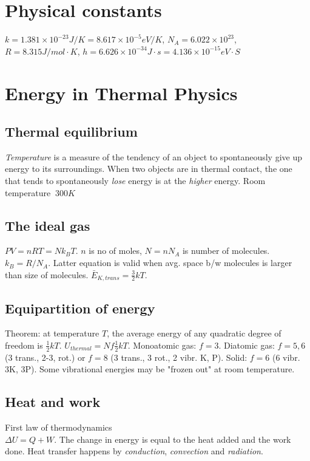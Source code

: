 \documentclass[11pt,twocolumn]{amsart}
\begin{document}
\section{Physical constants}
$k=1.381\times10^{-23}J/K = 8.617\times10^{-5}eV/K$, $N_A = 6.022\times10^{23}$, $R=8.315 J/mol\cdot K$, $h=6.626\times10^{-34}J\cdot s = 4.136\times10^{-15}eV\cdot S$

\section{Energy in Thermal Physics}

\subsection{Thermal equilibrium}
\emph{Temperature} is a measure of the tendency of an object to spontaneously give up energy to its surroundings. When two objects are in thermal contact, the one that tends to spontaneously \emph{lose} energy is at the \emph{higher} energy. Room temperature $~300K$

\subsection{The ideal gas} $PV = nRT = Nk_BT$. $n$ is no of moles, $N=nN_A$ is number of molecules. $k_B = R/N_A$. Latter equation is valid when avg. space b/w molecules is larger than size of molecules. $\bar{E}_{K,trans} = \frac{3}{2}kT$.

\subsection{Equipartition of energy}
Theorem: at temperature $T$, the average energy of any quadratic degree of freedom is $\frac{1}{2}kT$. $U_{thermal} = Nf\frac{1}{2}kT$. Monoatomic gas: $f=3$. Diatomic gas: $f=5,6$ (3 trans., 2-3, rot.) or $f=8$ (3 trans., 3 rot., 2 vibr. K, P). Solid: $f=6$ (6 vibr. 3K, 3P). Some vibrational energies may be "frozen out" at room temperature.

\subsection{Heat and work}  
First law of thermodynamics \\$\Delta U = Q + W$. The change in energy is equal to the heat added and the work done. Heat transfer happens by \emph{conduction}, \emph{convection} and \emph{radiation}.
\end{document}
